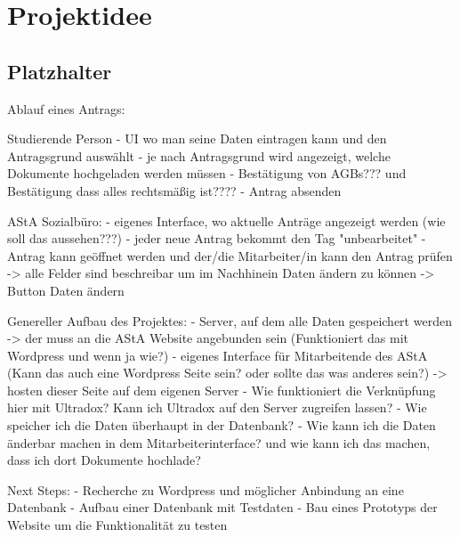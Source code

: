 
\chapter{Projektidee}
\label{cha:Projektidee}

\section{Platzhalter}
\label{sec:tbd}

Ablauf eines Antrags:

Studierende Person
- UI wo man seine Daten eintragen kann und den Antragsgrund auswählt
- je nach Antragsgrund wird angezeigt, welche Dokumente hochgeladen werden müssen 
- Bestätigung von AGBs??? und Bestätigung dass alles rechtsmäßig ist???? 
- Antrag absenden

AStA Sozialbüro: 
- eigenes Interface, wo aktuelle Anträge angezeigt werden (wie soll das aussehen???)
- jeder neue Antrag bekommt den Tag "unbearbeitet"
- Antrag kann geöffnet werden und der/die Mitarbeiter/in kann den Antrag prüfen -> alle Felder sind beschreibar um im Nachhinein Daten ändern zu können -> Button Daten ändern


Genereller Aufbau des Projektes: 
- Server, auf dem alle Daten gespeichert werden -> der muss an die AStA Website angebunden sein (Funktioniert das mit Wordpress und wenn ja wie?)
- eigenes Interface für Mitarbeitende des AStA (Kann das auch eine Wordpress Seite sein? oder sollte das was anderes sein?) -> hosten dieser Seite auf dem eigenen Server
- Wie funktioniert die Verknüpfung hier mit Ultradox? Kann ich Ultradox auf den Server zugreifen lassen? 
- Wie speicher ich die Daten überhaupt in der Datenbank? 
- Wie kann ich die Daten änderbar machen in dem Mitarbeiterinterface? und wie kann ich das machen, dass ich dort Dokumente hochlade? 

Next Steps: 
- Recherche zu Wordpress und möglicher Anbindung an eine Datenbank 
- Aufbau einer Datenbank mit Testdaten
- Bau eines Prototyps der Website um die Funktionalität zu testen 